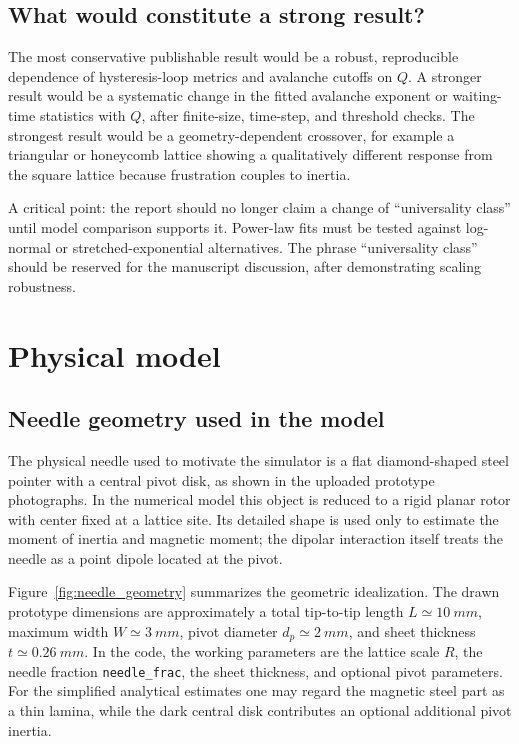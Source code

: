 \documentclass[11pt,a4paper]{article}
\newcommand{\code}[1]{\texttt{#1}}
\begin{document}
\subsection{What would constitute a strong result?}

The most conservative publishable result would be a robust, reproducible dependence of hysteresis-loop metrics and avalanche cutoffs on $Q$. A stronger result would be a systematic change in the fitted avalanche exponent or waiting-time statistics with $Q$, after finite-size, time-step, and threshold checks. The strongest result would be a geometry-dependent crossover, for example a triangular or honeycomb lattice showing a qualitatively different response from the square lattice because frustration couples to inertia.

A critical point: the report should no longer claim a change of ``universality class'' until model comparison supports it. Power-law fits must be tested against log-normal or stretched-exponential alternatives. The phrase ``universality class'' should be reserved for the manuscript discussion, after demonstrating scaling robustness.

\section{Physical model}
\label{sec:model}


\subsection{Needle geometry used in the model}

The physical needle used to motivate the simulator is a flat diamond-shaped steel pointer with a central pivot disk, as shown in the uploaded prototype photographs. In the numerical model this object is reduced to a rigid planar rotor with center fixed at a lattice site. Its detailed shape is used only to estimate the moment of inertia and magnetic moment; the dipolar interaction itself treats the needle as a point dipole located at the pivot.

Figure~\ref{fig:needle_geometry} summarizes the geometric idealization. The drawn prototype dimensions are approximately a total tip-to-tip length $L\simeq\SI{10}{mm}$, maximum width $W\simeq\SI{3}{mm}$, pivot diameter $d_p\simeq\SI{2}{mm}$, and sheet thickness $t\simeq\SI{0.26}{mm}$. In the code, the working parameters are the lattice scale $R$, the needle fraction \code{needle\_frac}, the sheet thickness, and optional pivot parameters. For the simplified analytical estimates one may regard the magnetic steel part as a thin lamina, while the dark central disk contributes an optional additional pivot inertia.
\end{document}
